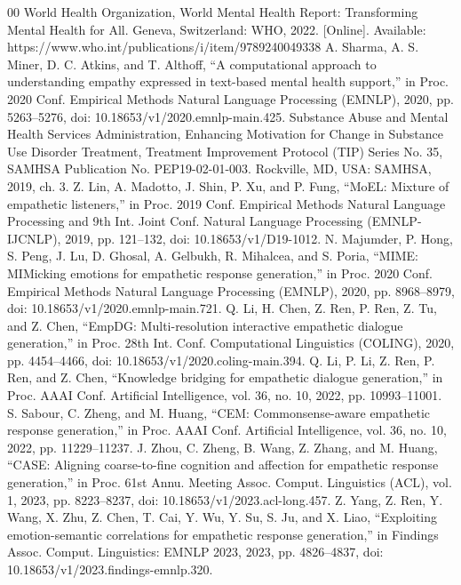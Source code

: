 \documentclass[conference]{IEEEtran}
\begin{document}
\begin{thebibliography}{00}
 World Health Organization, World Mental Health Report: Transforming Mental Health for All. Geneva, Switzerland: WHO, 2022. [Online]. Available: https://www.who.int/publications/i/item/9789240049338
 A. Sharma, A. S. Miner, D. C. Atkins, and T. Althoff, ``A computational approach to understanding empathy expressed in text-based mental health support,'' in Proc. 2020 Conf. Empirical Methods Natural Language Processing (EMNLP), 2020, pp. 5263--5276, doi: 10.18653/v1/2020.emnlp-main.425.
 Substance Abuse and Mental Health Services Administration, Enhancing Motivation for Change in Substance Use Disorder Treatment, Treatment Improvement Protocol (TIP) Series No. 35, SAMHSA Publication No. PEP19-02-01-003. Rockville, MD, USA: SAMHSA, 2019, ch. 3.
 Z. Lin, A. Madotto, J. Shin, P. Xu, and P. Fung, ``MoEL: Mixture of empathetic listeners,'' in Proc. 2019 Conf. Empirical Methods Natural Language Processing and 9th Int. Joint Conf. Natural Language Processing (EMNLP-IJCNLP), 2019, pp. 121--132, doi: 10.18653/v1/D19-1012.
 N. Majumder, P. Hong, S. Peng, J. Lu, D. Ghosal, A. Gelbukh, R. Mihalcea, and S. Poria, ``MIME: MIMicking emotions for empathetic response generation,'' in Proc. 2020 Conf. Empirical Methods Natural Language Processing (EMNLP), 2020, pp. 8968--8979, doi: 10.18653/v1/2020.emnlp-main.721.
 Q. Li, H. Chen, Z. Ren, P. Ren, Z. Tu, and Z. Chen, ``EmpDG: Multi-resolution interactive empathetic dialogue generation,'' in Proc. 28th Int. Conf. Computational Linguistics (COLING), 2020, pp. 4454--4466, doi: 10.18653/v1/2020.coling-main.394.
 Q. Li, P. Li, Z. Ren, P. Ren, and Z. Chen, ``Knowledge bridging for empathetic dialogue generation,'' in Proc. AAAI Conf. Artificial Intelligence, vol. 36, no. 10, 2022, pp. 10993--11001.
 S. Sabour, C. Zheng, and M. Huang, ``CEM: Commonsense-aware empathetic response generation,'' in Proc. AAAI Conf. Artificial Intelligence, vol. 36, no. 10, 2022, pp. 11229--11237.
 J. Zhou, C. Zheng, B. Wang, Z. Zhang, and M. Huang, ``CASE: Aligning coarse-to-fine cognition and affection for empathetic response generation,'' in Proc. 61st Annu. Meeting Assoc. Comput. Linguistics (ACL), vol. 1, 2023, pp. 8223--8237, doi: 10.18653/v1/2023.acl-long.457.
 Z. Yang, Z. Ren, Y. Wang, X. Zhu, Z. Chen, T. Cai, Y. Wu, Y. Su, S. Ju, and X. Liao, ``Exploiting emotion-semantic correlations for empathetic response generation,'' in Findings Assoc. Comput. Linguistics: EMNLP 2023, 2023, pp. 4826--4837, doi: 10.18653/v1/2023.findings-emnlp.320.

\end{thebibliography}
\end{document}
